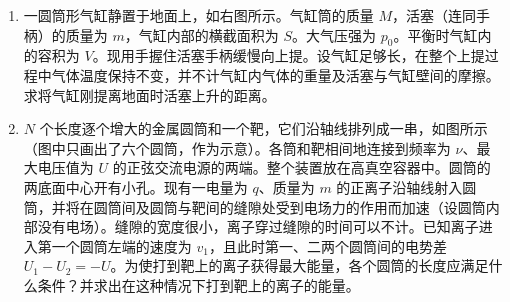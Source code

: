 \documentclass[\gkver]{gaokaozhenti}
\begin{document}
\begin{enumerate}


\item
一圆筒形气缸静置于地面上，如右图所示。气缸筒的质量 $M$，活塞（连同手柄）的质量为 $m$，气缸内部的横截面积为 $S$。大气压强为 $p_{0}$。平衡时气缸内的容积为 $V$。现用手握住活塞手柄缓慢向上提。设气缸足够长，在整个上提过程中气体温度保持不变，并不计气缸内气体的重量及活塞与气缸壁间的摩擦。求将气缸刚提离地面时活塞上升的距离。



\item
$N$ 个长度逐个增大的金属圆筒和一个靶，它们沿轴线排列成一串，如图所示（图中只画出了六个圆筒，作为示意）。各筒和靶相间地连接到频率为 $\nu$、最大电压值为 $U$ 的正弦交流电源的两端。整个装置放在高真空容器中。圆筒的两底面中心开有小孔。现有一电量为 $q$、质量为 $m$ 的正离子沿轴线射入圆筒，并将在圆筒间及圆筒与靶间的缝隙处受到电场力的作用而加速（设圆筒内部没有电场）。缝隙的宽度很小，离子穿过缝隙的时间可以不计。已知离子进入第一个圆筒左端的速度为 $v_{1}$，且此时第一、二两个圆筒间的电势差 $U_{1}-U_{2}=-U$。为使打到靶上的离子获得最大能量，各个圆筒的长度应满足什么条件？并求出在这种情况下打到靶上的离子的能量。


\end{enumerate}
\end{document}
